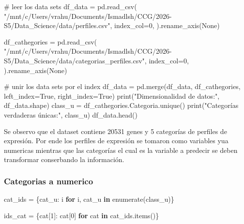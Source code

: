 \documentclass[
  10pt,
]{article}
\newenvironment{Shaded}{\begin{snugshade}}{\end{snugshade}}
\newcommand{\BuiltInTok}[1]{\textcolor[rgb]{0.00,0.23,0.31}{#1}}
\newcommand{\CommentTok}[1]{\textcolor[rgb]{0.37,0.37,0.37}{#1}}
\newcommand{\ControlFlowTok}[1]{\textcolor[rgb]{0.00,0.23,0.31}{\textbf{#1}}}
\newcommand{\DecValTok}[1]{\textcolor[rgb]{0.68,0.00,0.00}{#1}}
\newcommand{\KeywordTok}[1]{\textcolor[rgb]{0.00,0.23,0.31}{\textbf{#1}}}
\newcommand{\NormalTok}[1]{\textcolor[rgb]{0.00,0.23,0.31}{#1}}
\newcommand{\OperatorTok}[1]{\textcolor[rgb]{0.37,0.37,0.37}{#1}}
\newcommand{\StringTok}[1]{\textcolor[rgb]{0.13,0.47,0.30}{#1}}
\newcommand{\VariableTok}[1]{\textcolor[rgb]{0.07,0.07,0.07}{#1}}
\begin{document}
\begin{Shaded}
\begin{Highlighting}[]
\CommentTok{\# leer los data sets}
\NormalTok{df\_data }\OperatorTok{=}\NormalTok{ pd.read\_csv(}
    \StringTok{"/mnt/c/Users/vrahu/Documents/Ismadlsh/CCG/2026{-}S5/Data\_Science/data/perfiles.csv"}\NormalTok{,}
\NormalTok{    index\_col}\OperatorTok{=}\DecValTok{0}\NormalTok{,}
\NormalTok{).rename\_axis(}\VariableTok{None}\NormalTok{)}

\NormalTok{df\_cathegories }\OperatorTok{=}\NormalTok{ pd.read\_csv(}
    \StringTok{"/mnt/c/Users/vrahu/Documents/Ismadlsh/CCG/2026{-}S5/Data\_Science/data/categorias\_perfiles.csv"}\NormalTok{,}
\NormalTok{    index\_col}\OperatorTok{=}\DecValTok{0}\NormalTok{,}
\NormalTok{).rename\_axis(}\VariableTok{None}\NormalTok{)}

\CommentTok{\# unir los data sets por el index}
\NormalTok{df\_data }\OperatorTok{=}\NormalTok{ pd.merge(df\_data, df\_cathegories, left\_index}\OperatorTok{=}\VariableTok{True}\NormalTok{, right\_index}\OperatorTok{=}\VariableTok{True}\NormalTok{)}
\BuiltInTok{print}\NormalTok{(}\StringTok{"Dimensionalidad de datos:"}\NormalTok{, df\_data.shape)}
\NormalTok{class\_u }\OperatorTok{=}\NormalTok{ df\_cathegories.Categoria.unique()}
\BuiltInTok{print}\NormalTok{(}\StringTok{"Categorías verdaderas únicas:"}\NormalTok{, class\_u)}
\NormalTok{df\_data.head()}
\end{Highlighting}
\end{Shaded}

Se observo que el dataset contiene 20531 genes y 5 categorías de
perfiles de expresión. Por ende los perfiles de expresión se tomaron
como variables yua numericas mientras que las categorías el cual es la
variable a predecir se deben transformar conserbando la información.

\subsubsection{Categorias a numerico}\label{categorias-a-numerico}

\begin{Shaded}
\begin{Highlighting}[]
\NormalTok{cat\_ids }\OperatorTok{=}\NormalTok{ \{cat\_u: i }\ControlFlowTok{for}\NormalTok{ i, cat\_u }\KeywordTok{in} \BuiltInTok{enumerate}\NormalTok{(class\_u)\}}

\NormalTok{ids\_cat }\OperatorTok{=}\NormalTok{ \{cat[}\DecValTok{1}\NormalTok{]: cat[}\DecValTok{0}\NormalTok{] }\ControlFlowTok{for}\NormalTok{ cat }\KeywordTok{in}\NormalTok{ cat\_ids.items()\}}
\end{Highlighting}
\end{Shaded}
\end{document}

